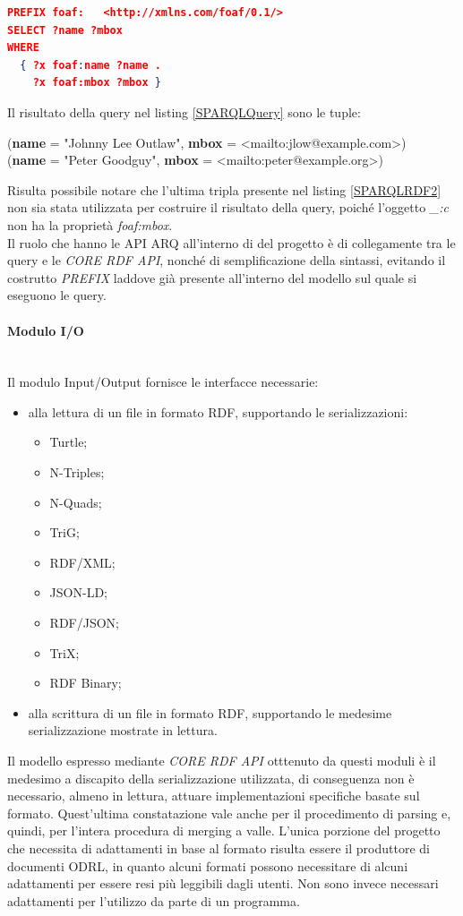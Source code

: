 \documentclass[12pt,a4paper,twoside]{book}
\begin{document}
\begin{lstlisting}[language=json,firstnumber=1,caption={Query SPARQL per il recupero dei nomi e delle mail solo per soggetti che presentano entrambe le proprietà},captionpos=b,label=SPARQLQuery2]
PREFIX foaf:   <http://xmlns.com/foaf/0.1/>
SELECT ?name ?mbox
WHERE
  { ?x foaf:name ?name .
    ?x foaf:mbox ?mbox }
\end{lstlisting}\mbox{}
Il risultato della query nel listing \ref{SPARQLQuery} sono le tuple:
\begin{center}
(\textbf{name} = "Johnny Lee Outlaw", \textbf{mbox} = <mailto:jlow@example.com>)\\
(\textbf{name} = "Peter Goodguy",	\textbf{mbox} = <mailto:peter@example.org>)
\end{center}
Risulta possibile notare che l'ultima tripla presente nel listing \ref{SPARQLRDF2} non sia stata utilizzata per costruire il risultato della query, poiché l'oggetto \textit{\_:c} non ha la proprietà \textit{foaf:mbox}.\\
Il ruolo che hanno le API ARQ all'interno di del progetto è di collegamente tra le query e le \textit{CORE RDF API}, nonché di semplificazione della sintassi, evitando il costrutto \textit{PREFIX} laddove già presente all'interno del modello sul quale si eseguono le query.
\paragraph{Modulo I/O}\mbox{}\\
Il modulo Input/Output fornisce le interfacce necessarie:
\begin{itemize}
\item alla lettura di un file in formato RDF, supportando le serializzazioni:
\begin{itemize}
\item Turtle;
\item N-Triples;
\item N-Quads;
\item TriG;
\item RDF/XML;
\item JSON-LD;
\item RDF/JSON;
\item TriX;
\item RDF Binary;
\end{itemize}
\item alla scrittura di un file in formato RDF, supportando le medesime serializzazione mostrate in lettura.
\end{itemize}
Il modello espresso mediante \textit{CORE RDF API} otttenuto da questi moduli è il medesimo a discapito della serializzazione utilizzata, di conseguenza non è necessario, almeno in lettura, attuare implementazioni specifiche basate sul formato. Quest'ultima constatazione vale anche per il procedimento di parsing e, quindi, per l'intera procedura di merging a valle. L'unica porzione del progetto che necessita di adattamenti in base al formato risulta essere il produttore di documenti ODRL, in quanto alcuni formati possono necessitare di alcuni adattamenti per essere resi più leggibili dagli utenti. Non sono invece necessari adattamenti per l'utilizzo da parte di un programma.
\end{document}
